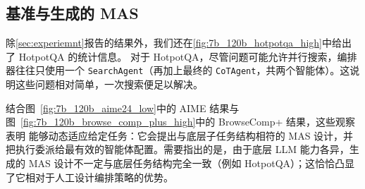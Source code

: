 

\subsection{基准与生成的 MAS}
\label{ap:benchmark_generated_mas}

除\cref{sec:experiemnt}报告的结果外，我们还在\cref{fig:7b_120b_hotpotqa_high}中给出了 HotpotQA 的统计信息。
对于 HotpotQA，尽管问题可能允许并行搜索，编排器往往只使用一个 \texttt{SearchAgent}（再加上最终的 \texttt{CoTAgent}，共两个智能体）。这说明这些问题相对简单，一次搜索便足以解决。

结合图~\ref{fig:7b_120b_aime24_low}中的 AIME 结果与图~\ref{fig:7b_120b_browse_comp_plus_high}中的 BrowseComp+ 结果，这些观察表明 \ourframework 能够动态适应给定任务：它会提出与底层子任务结构相符的 MAS 设计，并把执行委派给最有效的智能体配置。需要指出的是，由于底层 LLM 能力各异，生成的 MAS 设计不一定与底层任务结构完全一致（例如 HotpotQA）；这恰恰凸显了它相对于人工设计编排策略的优势。






